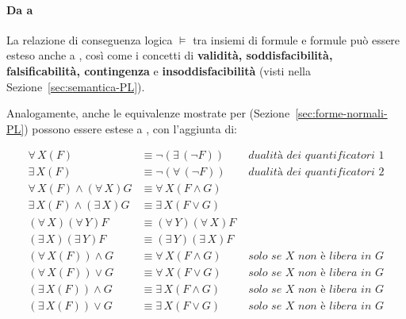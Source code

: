 \documentclass[italian, 10pt]{article}
\begin{document}
\paragraph{Da \PL a \FOL}

La relazione di conseguenza logica \(\vDash\) tra insiemi di formule e formule può essere esteso anche a \FOL, così come i concetti di \textbf{validità, soddisfacibilità, falsificabilità, contingenza} e \textbf{insoddisfacibilità} (visti nella Sezione~\ref{sec:semantica-PL}).

Analogamente, anche le equivalenze mostrate per \PL (Sezione~\ref{sec:forme-normali-PL}) possono essere estese a \FOL, con l'aggiunta di:

\begin{align*}
  \forall \, X (F)                       & \equiv \lnot \left(\exists \, (\lnot F)\right) & \textit{ dualità dei quantificatori } 1           \\
  \exists \, X (F)                       & \equiv \lnot \left(\forall \, (\lnot F)\right) & \textit{ dualità dei quantificatori } 2           \\
  \forall \, X(F) \land (\forall \, X) G & \equiv \forall \, X (F \land G)                                                                    \\
  \exists \, X(F) \land (\exists \, X) G & \equiv \exists \, X (F \lor G)                                                                     \\
  (\forall \, X) (\forall \, Y) F        & \equiv (\forall \, Y) (\forall \, X) F                                                             \\
  (\exists \, X) (\exists \, Y) F        & \equiv (\exists \, Y) (\exists \, X) F                                                             \\
  (\forall \, X(F)) \land G              & \equiv \forall \, X (F \land G)                & \textit{ solo se } X \textit{ non è libera in } G \\
  (\forall \, X(F)) \lor G               & \equiv \forall \, X (F \lor G)                 & \textit{ solo se } X \textit{ non è libera in } G \\
  (\exists \, X(F)) \land G              & \equiv \exists \, X (F \land G)                & \textit{ solo se } X \textit{ non è libera in } G \\
  (\exists \, X(F)) \lor G               & \equiv \exists \, X (F \lor G)                 & \textit{ solo se } X \textit{ non è libera in } G \\
\end{align*}
\end{document}
